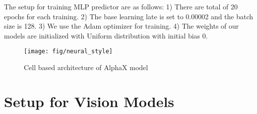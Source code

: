 \documentclass[10pt,twocolumn,letterpaper]{article}
\begin{document}
The setup for training MLP predictor are as follows: 1) There are total of 20 epochs for each training. 2) The base learning late is set to 0.00002 and the batch size is 128. 3) We use the Adam optimizer for training.
4) The weights of our models are initialized with Uniform distribution with initial bias 0.


\begin{figure}[t]
\centering 
\texttt{[image: fig/neural\_style]}
\caption{Cell based architecture of AlphaX model}
\label{neural_style}
\end{figure}

\section{Setup for Vision Models}
\end{document}
